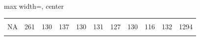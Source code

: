 \begin{landscape}
\begin{adjustbox}{max width=\linewidth, center}
\begin{tabular}{lrrrrrrrrrr}
\cellcolor{gray!15}{Urge Govts to Protect Trees} & \cellcolor{gray!15}{232} & \cellcolor{gray!15}{116} & \cellcolor{gray!15}{108} & \cellcolor{gray!15}{128} & \cellcolor{gray!15}{131} & \cellcolor{gray!15}{140} & \cellcolor{gray!15}{113} & \cellcolor{gray!15}{118} & \cellcolor{gray!15}{141} & \cellcolor{gray!15}{1227}\\
NA & 261 & 130 & 137 & 130 & 131 & 127 & 130 & 116 & 132 & 1294\\
\textbf{\cellcolor{gray!15}{Total}} & \textbf{\cellcolor{gray!15}{1956}} & \textbf{\cellcolor{gray!15}{1015}} & \textbf{\cellcolor{gray!15}{997}} & \textbf{\cellcolor{gray!15}{1008}} & \textbf{\cellcolor{gray!15}{984}} & \textbf{\cellcolor{gray!15}{1070}} & \textbf{\cellcolor{gray!15}{958}} & \textbf{\cellcolor{gray!15}{950}} & \textbf{\cellcolor{gray!15}{1012}} & \textbf{\cellcolor{gray!15}{NA}}\\
\bottomrule
\end{tabular}
\endgroup{}

\end{adjustbox}
\end{landscape}

